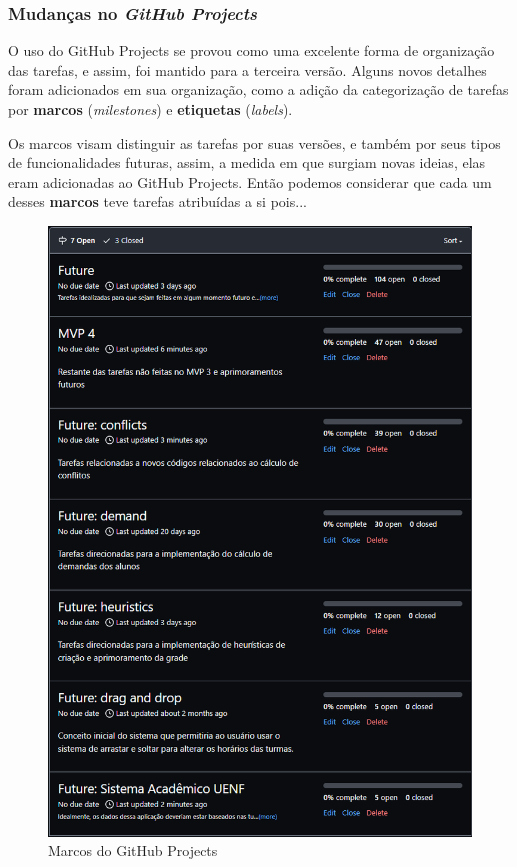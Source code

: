 \subsubsection{Mudanças no \textit{GitHub Projects}}

O uso do GitHub Projects se provou como uma excelente forma de organização das tarefas, e assim, foi mantido para a terceira versão. Alguns novos detalhes foram adicionados em sua organização, como a adição da categorização de tarefas por \textbf{marcos} (\textit{milestones}) e \textbf{etiquetas} (\textit{labels}).


Os marcos visam distinguir as tarefas por suas versões, e também por seus tipos de funcionalidades futuras, assim, a medida em que surgiam novas ideias, elas eram adicionadas ao GitHub Projects. Então podemos considerar que cada um desses \textbf{marcos} teve tarefas atribuídas a si pois...

\begin{figure}[htbp]
  \centering
  \caption{Marcos do GitHub Projects\label{fig:ProjectsMilestones}}
  \includegraphics[scale=0.6]{files/img/Codificacao/GitHubProjects - Open Milestones.png}
  \legend{\selfAuthor}
\end{figure}

